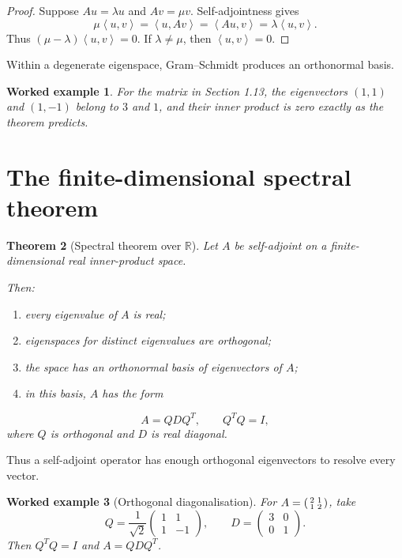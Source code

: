 \documentclass[11pt,a5paper,oneside,openany]{scrreprt}
\theoremstyle{notes}
\newtheorem{theorem}{Theorem}[section]
\theoremstyle{definitions}
\newtheorem{example}[theorem]{Worked example}
\newcommand{\R}{\mathbb{R}}
\newcommand{\ip}[2]{\left\langle #1,#2\right\rangle}
\begin{document}
\begin{proof}
Suppose $Au=\lambda u$ and $Av=\mu v$.  Self-adjointness gives
\[
 \mu\ip{u}{v}=\ip{u}{Av}=\ip{Au}{v}=\lambda\ip{u}{v}.
\]
Thus $(\mu-\lambda)\ip{u}{v}=0$.  If $\lambda\ne\mu$, then
$\ip{u}{v}=0$.
\end{proof}

Within a degenerate eigenspace, Gram--Schmidt produces an orthonormal basis.

\begin{example}
For the matrix in Section 1.13, the eigenvectors $(1,1)$ and $(1,-1)$ belong
to $3$ and $1$, and their inner product is zero exactly as the theorem predicts.
\end{example}

\newpage
\section{The finite-dimensional spectral theorem}

\begin{theorem}[Spectral theorem over $\R$]
Let $A$ be self-adjoint on a finite-dimensional real inner-product space.

Then:
\begin{enumerate}[label=(\roman*),leftmargin=2.7em]
  \item every eigenvalue of $A$ is real;
  \item eigenspaces for distinct eigenvalues are orthogonal;
  \item the space has an orthonormal basis of eigenvectors of $A$;
  \item in this basis, $A$ has the form
\end{enumerate}
\vspace{-0.8\baselineskip}
\[
  A=QDQ^T,
  \qquad Q^TQ=I,
\]
where $Q$ is orthogonal and $D$ is real diagonal.
\end{theorem}

Thus a self-adjoint operator has enough orthogonal eigenvectors to resolve
every vector.

\begin{example}[Orthogonal diagonalisation]
For $A=\begin{psmallmatrix}2&1\\1&2\end{psmallmatrix}$, take
\[
 Q=\frac1{\sqrt2}\begin{pmatrix}1&1\\1&-1\end{pmatrix},
 \qquad D=\begin{pmatrix}3&0\\0&1\end{pmatrix}.
\]
Then $Q^TQ=I$ and $A=QDQ^T$.
\end{example}
\end{document}
